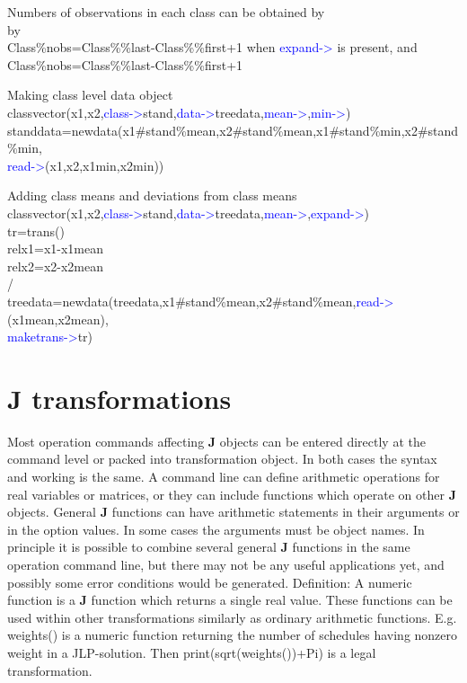 \begin{note}
Numbers of observations in each class can be obtained by \\by \\
Class\%nobs=Class\%\%last-Class\%\%first+1 when \textcolor{blue}{expand->} is present, and \\
Class\%nobs=Class\%\%last-Class\%\%first+1
\end{note}
\begin{example}[newclassdata]Making class level data object\\
\label{newclassdata}
\textcolor{VioletRed}{classvector}(x1,x2,\textcolor{blue}{class->}stand,\textcolor{blue}{data->}treedata,\textcolor{blue}{mean->},\textcolor{blue}{min->})\\
standdata=\textcolor{VioletRed}{newdata}(x1\#stand\%mean,x2\#stand\%mean,x1\#stand\%min,x2\#stand\%min,\\
\textcolor{blue}{read->}(x1,x2,x1min,x2min))
\end{example}
\begin{example}[addingclass]Adding class means and deviations from class means\\
\label{addingclass}
\textcolor{VioletRed}{classvector}(x1,x2,\textcolor{blue}{class->}stand,\textcolor{blue}{data->}treedata,\textcolor{blue}{mean->},\textcolor{blue}{expand->})\\
tr=\textcolor{VioletRed}{trans}()\\
relx1=x1-x1mean\\
relx2=x2-x2mean\\
/\\
treedata=\textcolor{VioletRed}{newdata}(treedata,x1\#stand\%mean,x2\#stand\%mean,\textcolor{blue}{read->}(x1mean,x2mean),\\
\textcolor{blue}{maketrans->}tr)
\end{example}
\section{J transformations}
\label{jtrans}
 Most operation commands affecting \textbf{J} objects can be entered directly at the command level or
 packed into transformation object. In both cases the syntax and working is the same. A
 command line can define arithmetic operations for real variables or matrices, or they can
 include functions which operate on other \textbf{J} objects. General \textbf{J} functions can have arithmetic
 statements in their arguments or in the option values. In some cases the arguments must be
 object names. In principle it is possible to combine several general \textbf{J} functions in the same
 operation command line, but there may not be any useful applications yet, and possibly some
 error conditions would be generated.
 Definition: A numeric function is a \textbf{J} function which returns a single real value. These functions
 can be used within other transformations similarly as ordinary arithmetic functions. E.g.
 \textcolor{VioletRed}{weights}() is a numeric function returning the number of schedules having nonzero weight
 in a JLP-solution. Then \textcolor{VioletRed}{print}(\textcolor{VioletRed}{sqrt}(\textcolor{VioletRed}{weights}())+Pi) is a legal transformation.
